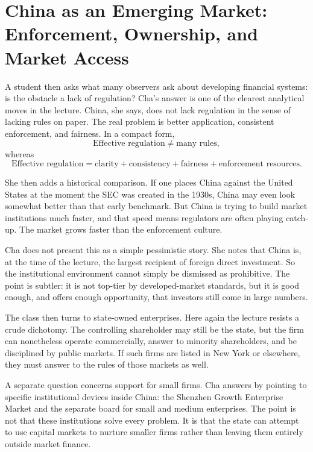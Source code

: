 \section{China as an Emerging Market: Enforcement, Ownership, and Market Access}

A student then asks what many observers ask about developing financial systems: is the obstacle a lack of regulation? Cha's answer is one of the clearest analytical moves in the lecture. China, she says, does not lack regulation in the sense of lacking rules on paper. The real problem is better application, consistent enforcement, and fairness. In a compact form,
\begin{equation}
\text{Effective regulation} \neq \text{many rules},
\end{equation}
whereas
\begin{equation}
\text{Effective regulation}
=
\text{clarity}
+
\text{consistency}
+
\text{fairness}
+
\text{enforcement resources}.
\end{equation}

She then adds a historical comparison. If one places China against the United States at the moment the SEC was created in the 1930s, China may even look somewhat better than that early benchmark. But China is trying to build market institutions much faster, and that speed means regulators are often playing catch-up. The market grows faster than the enforcement culture.

Cha does not present this as a simple pessimistic story. She notes that China is, at the time of the lecture, the largest recipient of foreign direct investment. So the institutional environment cannot simply be dismissed as prohibitive. The point is subtler: it is not top-tier by developed-market standards, but it is good enough, and offers enough opportunity, that investors still come in large numbers.

The class then turns to state-owned enterprises. Here again the lecture resists a crude dichotomy. The controlling shareholder may still be the state, but the firm can nonetheless operate commercially, answer to minority shareholders, and be disciplined by public markets. If such firms are listed in New York or elsewhere, they must answer to the rules of those markets as well.

A separate question concerns support for small firms. Cha answers by pointing to specific institutional devices inside China: the Shenzhen Growth Enterprise Market and the separate board for small and medium enterprises. The point is not that these institutions solve every problem. It is that the state can attempt to use capital markets to nurture smaller firms rather than leaving them entirely outside market finance.

